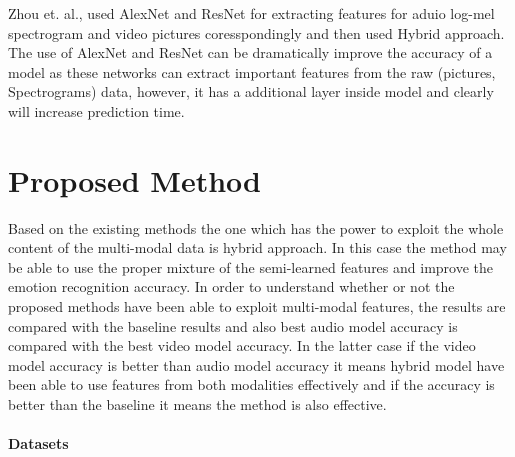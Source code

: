 \documentclass[oneside]{report}
\begin{document}
    Zhou et. al., \cite{china_2020} used AlexNet and ResNet for extracting features for aduio log-mel spectrogram and video pictures coresspondingly and then used Hybrid approach. The use of AlexNet and ResNet can be dramatically improve the accuracy of a model as these networks can extract important features from the raw (pictures, Spectrograms) data, however, it has a additional layer inside model and clearly will increase prediction time. 

\chapter{Proposed Method}

    Based on the existing methods the one which has the power to exploit the whole content of the multi-modal data is hybrid approach. In this case the method may be able to use the proper mixture of the semi-learned features and improve the emotion recognition accuracy. In order to understand whether or not the proposed methods have been able to exploit multi-modal features, the results are compared with the baseline results \cite{stanford_2020} and also best audio model accuracy is compared with the best video model accuracy. In the latter case if the video model accuracy is better than audio model accuracy it means hybrid model have been able to use features from both modalities effectively and if the accuracy is better than the baseline it means the method is also effective. 
    
    \subsubsection{Datasets}
    
\end{document}
